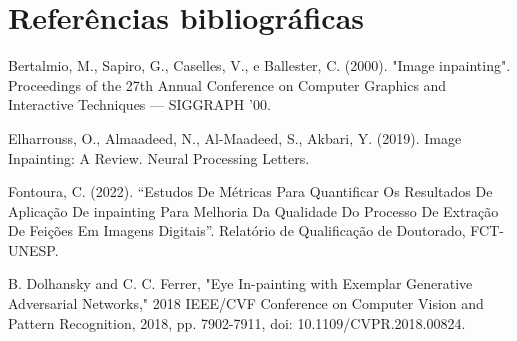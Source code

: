 \section{Referências bibliográficas}
\begin{thebibliography}{99}
	
Bertalmio, M., Sapiro, G., Caselles, V., e Ballester, C. (2000). "Image inpainting". Proceedings of the 27th Annual Conference on Computer Graphics and Interactive Techniques — SIGGRAPH ’00.

Elharrouss, O., Almaadeed, N., Al-Maadeed, S., Akbari, Y. (2019). Image Inpainting: A Review. Neural Processing Letters.

Fontoura, C. (2022). “Estudos De Métricas Para Quantificar Os Resultados De Aplicação De inpainting Para Melhoria Da Qualidade Do Processo De Extração De Feições Em Imagens Digitais”. Relatório de Qualificação de Doutorado, FCT-UNESP.

B. Dolhansky and C. C. Ferrer, "Eye In-painting with Exemplar Generative Adversarial Networks," 2018 IEEE/CVF Conference on Computer Vision and Pattern Recognition, 2018, pp. 7902-7911, doi: 10.1109/CVPR.2018.00824.

\end{thebibliography}
